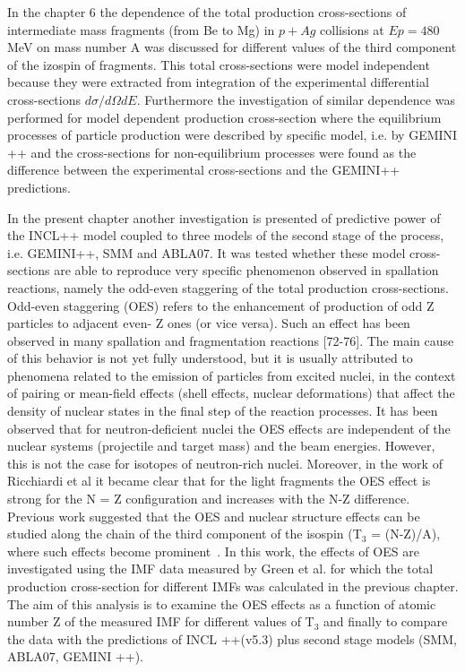 In the chapter 6 the dependence of the total  production cross-sections of intermediate mass fragments (from Be to Mg) in $p+Ag$ collisions at $Ep=480$ MeV on mass number A was discussed for different values of the third component of the izospin of fragments. 
This total cross-sections were model independent because they were extracted from integration of the experimental differential cross-sections $d\sigma/d\Omega dE$.  Furthermore the investigation of similar dependence was performed for model dependent production cross-section where the equilibrium processes of particle production were described by specific model, i.e. by GEMINI ++\cite{CHARITY1988,Charity2010} and the cross-sections for non-equilibrium processes were found as the difference between the experimental cross-sections and the GEMINI++ predictions.  

In the present chapter another investigation is presented of predictive power of the INCL++ model coupled to three models of the second stage of the process, i.e. GEMINI++, SMM\cite{SMMBondorf1995} and ABLA07\cite{kelic2009abla07}.  It was tested whether these model cross-sections are able
to reproduce very specific phenomenon observed in spallation reactions, namely the odd-even staggering of the total production cross-sections.
Odd-even staggering (OES) refers to the enhancement of production of odd Z particles to adjacent even- Z ones (or vice versa). Such an effect has been observed in many spallation and fragmentation reactions [72-76]. The main cause of this behavior is not yet fully understood, but it is usually attributed to phenomena related to the emission of particles from excited nuclei, in the context of pairing or mean-field effects (shell effects, nuclear deformations) that affect the density of nuclear states in the final step of the reaction processes. It has been observed that for neutron-deficient nuclei the OES effects are independent of the nuclear systems (projectile and target mass) and the beam energies\cite{Mei_OES}. However, this is not the case for isotopes of neutron-rich nuclei. Moreover, in the work of Ricchiardi et al \cite{RICCIARDI2004299_OES} it became clear that for the light fragments the OES effect is strong for the N = Z configuration and increases with the N-Z difference. Previous work suggested that the OES  and nuclear structure effects can be studied along the chain of the third component of the isospin (T$_3$ = (N-Z)/A), where such effects become prominent~\cite{Mei_OES}. In this work, the effects of OES are investigated using the IMF data measured by Green et al. \cite{Green1984} for which the total production cross-section for different IMFs was calculated in the previous chapter. The aim of this analysis is to examine the OES effects as a function of atomic number Z of the measured IMF for different values of T$_3$ and finally to compare the data with the predictions of INCL ++(v5.3) plus second stage models (SMM, ABLA07, GEMINI ++).
%
